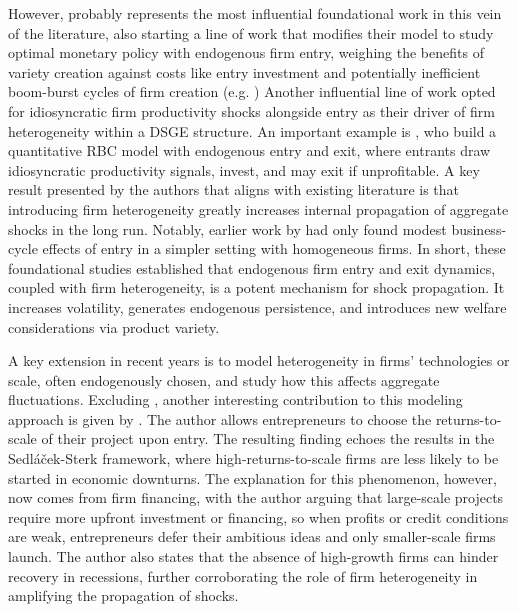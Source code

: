 \documentclass[a4paper,12pt]{article} %
\numberwithin{equation}{section} %
\numberwithin{figure}{section}
\numberwithin{table}{section}
\begin{document}
However, \textcite{bilbiie2012endogenous} probably represents the most influential foundational work in this vein of the literature, 
also starting a line of work that modifies their model to study optimal monetary policy with endogenous firm entry, weighing the benefits 
of variety creation against costs like entry investment and potentially inefficient boom-burst cycles of firm creation (e.g. \textcite{bilbiie2014optimal, lewis2012firm})
Another influential line of work opted for idiosyncratic firm productivity shocks alongside entry as their driver of firm heterogeneity within a DSGE structure. 
An important example is \textcite{clementi2016entry}, who build a quantitative RBC model with endogenous entry and exit, where entrants draw idiosyncratic 
productivity signals, invest, and may exit if unprofitable. A key result presented by the authors that aligns with existing literature is that introducing 
firm heterogeneity greatly increases internal propagation of aggregate shocks in the long run. Notably, earlier work by \textcite{samaniego2008entry} had 
only found modest business-cycle effects of entry in a simpler setting with homogeneous firms. In short, these foundational studies established that 
endogenous firm entry and exit dynamics, coupled with firm heterogeneity, is a potent mechanism for shock propagation. It increases volatility, 
generates endogenous persistence, and introduces new welfare considerations via product variety.

A key extension in recent years is to model heterogeneity in firms' technologies or scale, often endogenously chosen, and study how this 
affects aggregate fluctuations. Excluding \textcite{sedlavcek2017growth}, another interesting contribution to this modeling approach is given 
by \textcite{smirnyagin2023returns}. The author allows entrepreneurs to choose the returns-to-scale of their project upon entry. The resulting 
finding echoes the results in the Sedláček-Sterk framework, where high-returns-to-scale firms are less likely to be started in economic downturns.
The explanation for this phenomenon, however, now comes from firm financing, with the author arguing that large-scale projects require more 
upfront investment or financing, so when profits or credit conditions are weak, entrepreneurs defer their ambitious ideas and only smaller-scale 
firms launch. The author also states that the absence of high-growth firms can hinder recovery in recessions, further corroborating the role of 
firm heterogeneity in amplifying the propagation of shocks.
\end{document}
